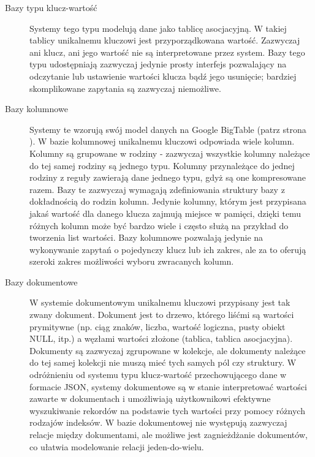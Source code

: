 \begin{description}
 \item[Bazy typu klucz-wartość]
 Systemy tego typu modelują dane jako tablicę asocjacyjną.
 W takiej tablicy unikalnemu kluczowi jest przyporządkowana wartość.
 Zazwyczaj ani klucz, ani jego wartość nie są interpretowane przez system.
 Bazy tego typu udostępniają zazwyczaj jedynie prosty interfejs pozwalający na odczytanie lub ustawienie wartości klucza bądź jego usunięcie; bardziej skomplikowane zapytania są zazwyczaj niemożliwe.
 
 \item[Bazy kolumnowe]
 Systemy te wzorują swój model danych na Google BigTable (patrz strona \pageref{google-bigtable-model-danych}).
 W bazie kolumnowej unikalnemu kluczowi odpowiada wiele kolumn.
 Kolumny są grupowane w rodziny - zazwyczaj wszystkie kolumny należące do tej samej rodziny są jednego typu.
 Kolumny przynależące do jednej rodziny z reguły zawierają dane jednego typu, gdyż są one kompresowane razem.
 Bazy te zazwyczaj wymagają zdefiniowania struktury bazy z dokładnością do rodzin kolumn.
 Jedynie kolumny, którym jest przypisana jakaś wartość dla danego klucza zajmują miejsce w pamięci, dzięki temu różnych kolumn może być bardzo wiele i często służą na przykład do tworzenia list wartości.
 Bazy kolumnowe pozwalają jedynie na wykonywanie zapytań o pojedynczy klucz lub ich zakres, ale za to oferują szeroki zakres możliwości wyboru zwracanych kolumn.

 \item[Bazy dokumentowe]
 W systemie dokumentowym unikalnemu kluczowi przypisany jest tak zwany dokument.
 Dokument jest to drzewo, którego liśćmi są wartości prymitywne (np. ciąg znaków, liczba, wartość logiczna, pusty obiekt NULL, itp.) a węzłami wartości złożone (tablica, tablica asocjacyjna).
 Dokumenty są zazwyczaj zgrupowane w kolekcje, ale dokumenty należące do tej samej kolekcji nie muszą mieć tych samych pól czy struktury.
 W odróżnieniu od systemu typu klucz-wartość przechowującego dane w formacie JSON, systemy dokumentowe są w stanie interpretować wartości zawarte w dokumentach i umożliwiają użytkownikowi efektywne wyszukiwanie rekordów na podstawie tych wartości przy pomocy różnych rodzajów indeksów.
 W bazie dokumentowej nie występują zazwyczaj relacje między dokumentami, ale możliwe jest zagnieżdżanie dokumentów, co ułatwia modelowanie relacji jeden-do-wielu.
 

\end{description}
